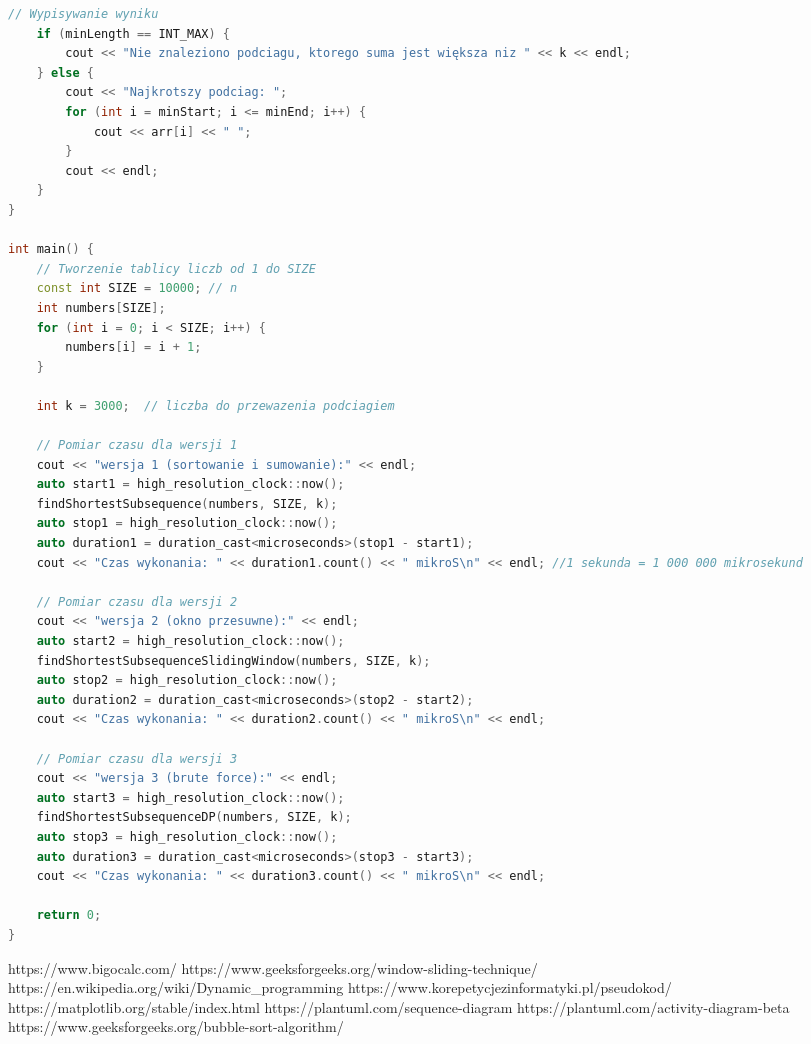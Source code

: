 \documentclass[12pt,twoside]{article}
\begin{document}
\begin{lstlisting}[language=C++, caption={main.cpp}, label={lst:program}]
    // Wypisywanie wyniku
    if (minLength == INT_MAX) {
        cout << "Nie znaleziono podciagu, ktorego suma jest większa niz " << k << endl;
    } else {
        cout << "Najkrotszy podciag: ";
        for (int i = minStart; i <= minEnd; i++) {
            cout << arr[i] << " ";
        }
        cout << endl;
    }
}

int main() {
    // Tworzenie tablicy liczb od 1 do SIZE
    const int SIZE = 10000; // n
    int numbers[SIZE];
    for (int i = 0; i < SIZE; i++) {
        numbers[i] = i + 1;
    }

    int k = 3000;  // liczba do przewazenia podciagiem

    // Pomiar czasu dla wersji 1
    cout << "wersja 1 (sortowanie i sumowanie):" << endl;
    auto start1 = high_resolution_clock::now();
    findShortestSubsequence(numbers, SIZE, k);
    auto stop1 = high_resolution_clock::now();
    auto duration1 = duration_cast<microseconds>(stop1 - start1);
    cout << "Czas wykonania: " << duration1.count() << " mikroS\n" << endl; //1 sekunda = 1 000 000 mikrosekund

    // Pomiar czasu dla wersji 2
    cout << "wersja 2 (okno przesuwne):" << endl;
    auto start2 = high_resolution_clock::now();
    findShortestSubsequenceSlidingWindow(numbers, SIZE, k);
    auto stop2 = high_resolution_clock::now();
    auto duration2 = duration_cast<microseconds>(stop2 - start2);
    cout << "Czas wykonania: " << duration2.count() << " mikroS\n" << endl;

    // Pomiar czasu dla wersji 3
    cout << "wersja 3 (brute force):" << endl;
    auto start3 = high_resolution_clock::now();
    findShortestSubsequenceDP(numbers, SIZE, k);
    auto stop3 = high_resolution_clock::now();
    auto duration3 = duration_cast<microseconds>(stop3 - start3);
    cout << "Czas wykonania: " << duration3.count() << " mikroS\n" << endl;

    return 0;
}
\end{lstlisting}

\begin{thebibliography}{4}
 https://www.bigocalc.com/
 https://www.geeksforgeeks.org/window-sliding-technique/
 https://en.wikipedia.org/wiki/Dynamic\_programming
 https://www.korepetycjezinformatyki.pl/pseudokod/
 https://matplotlib.org/stable/index.html
 https://plantuml.com/sequence-diagram
 https://plantuml.com/activity-diagram-beta
 https://www.geeksforgeeks.org/bubble-sort-algorithm/
\end{thebibliography}

\clearpage

\makesummary
\end{document}
